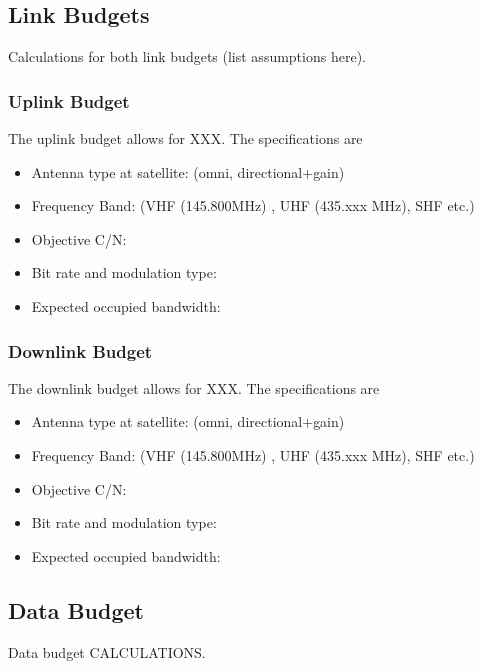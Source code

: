  


\subsection{Link Budgets}
Calculations for both link budgets (list assumptions here).

\subsubsection{Uplink Budget}
The uplink budget allows for XXX. The specifications are
\begin{itemize}
    \item Antenna type at satellite: (omni, directional$+$gain)
    \item Frequency Band: (VHF (145.800MHz) , UHF (435.xxx MHz), SHF etc.)
    \item Objective C/N:
    \item Bit rate and modulation type:
    \item Expected occupied bandwidth:
\end{itemize}

\subsubsection{Downlink Budget}
The downlink budget allows for XXX. The specifications are
\begin{itemize}
    \item Antenna type at satellite: (omni, directional$+$gain)
    \item Frequency Band: (VHF (145.800MHz) , UHF (435.xxx MHz), SHF etc.)
    \item Objective C/N:
    \item Bit rate and modulation type:
    \item Expected occupied bandwidth:
\end{itemize}

\subsection{Data Budget}
Data budget CALCULATIONS.


